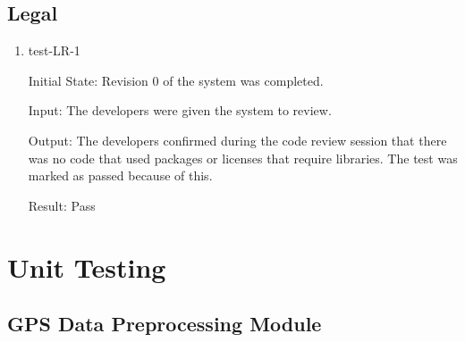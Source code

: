 \documentclass[12pt, titlepage]{article}
\begin{document}
\subsection{Legal}

\begin{enumerate}
    \item{test-LR-1} \label{test-LR-1}
    
    Initial State: Revision 0 of the system was completed.

    Input: The developers were given the system to review.
    
    Output: The developers confirmed during the code review session that there was no code that used packages or licenses that require libraries. The test was marked as passed because of this.
    
    Result: Pass
\end{enumerate}

\section{Unit Testing}

\subsection{GPS Data Preprocessing Module}
\end{document}
